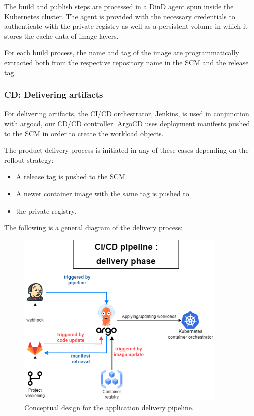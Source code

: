 \hspace{7mm}The build and publish steps are processed in a DinD agent spun inside the Kubernetes cluster. The agent is provided with the necessary credentials to authenticate with the private registry as well as a persistent volume in which it stores the cache data of image layers. 

\hspace{7mm}For each build process, the name and tag of the image are programmatically extracted both from the respective repository name in the SCM and the release tag. 

\subsubsection{CD: Delivering artifacts }

\hspace{7mm}For delivering artifacts, the CI/CD orchestrator, Jenkins, is used in conjunction with argocd, our CD/CD controller. ArgoCD uses deployment manifests pushed to the SCM in order to create the workload objects. 

\hspace{7mm}The product delivery process is initiated in any of these cases depending on the rollout strategy: 

\begin{itemize}[label={--}]
\item A release tag is pushed to the SCM. 
\item A newer container image with the same tag is pushed to \item the private registry. 
\end{itemize}

\hspace{7mm}The following is a general diagram of the delivery process: 

\begin{figure}[H]\centering
\includegraphics[width=0.9\textwidth,angle=00]{assets/f50.png}
\caption{Conceptual design for the application delivery pipeline.}
\label{fig:Conceptual design of Delivering artifacts }
\end{figure}

